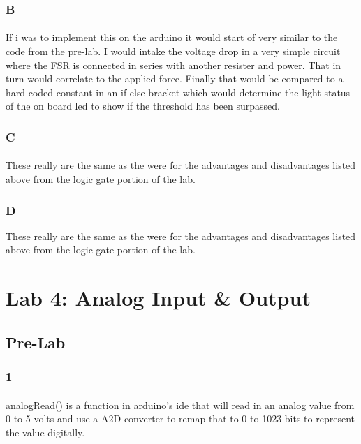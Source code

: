 \documentclass[12pt]{article}
\begin{document}
			\subsubsection{B}
				\paragraph{}
					If i was to implement this on the arduino it would start of very similar to the code from the pre-lab.  I would intake the voltage drop in a very simple circuit 
					where the FSR is connected in series with another resister and power.  That in turn would correlate to the applied force.  Finally that would be compared
					to a hard coded constant in an if else bracket which would determine the light status of the on board led to show if the threshold has been surpassed.

			\subsubsection{C}
				\paragraph{}
					These really are the same as the were for the advantages and disadvantages listed above from the logic gate portion of the lab.

			\subsubsection{D}
				These really are the same as the were for the advantages and disadvantages listed above from the logic gate portion of the lab.

	\section{Lab 4: Analog Input \& Output}
		\subsection{Pre-Lab}
			\subsubsection{1}
				\paragraph{}
					analogRead() is a function in arduino's ide that will read in an analog value from 0 to 5 volts and use a A2D converter to remap that to 0 to 1023 bits
					to represent the value digitally.
\end{document}
